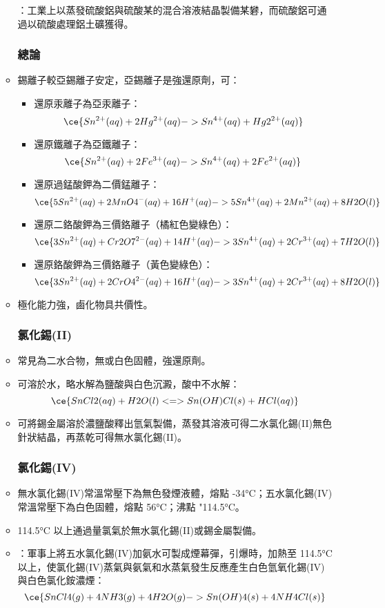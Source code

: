\documentclass[a4paper,12pt]{report}
\begin{document}
\begin{itemize}
\begin{itemize}
：工業上以蒸發硫酸鋁與硫酸某的混合溶液結晶製備某礬，而硫酸鋁可通過以硫酸處理鋁土礦獲得。
\subsubsection{總論}
\bit
\item 錫離子較亞錫離子安定，亞錫離子是強還原劑，可：
\begin{itemize}
\item 還原汞離子為亞汞離子：
\[\ce{Sn^{2+}(aq) + 2Hg^{2+}(aq) -> Sn^{4+}(aq) + Hg2^{2+}(aq)}\]
\item 還原鐵離子為亞鐵離子：
\[\ce{Sn^{2+}(aq) + 2Fe^{3+}(aq) -> Sn^{4+}(aq) + 2Fe^{2+}(aq)}\]
\item 還原過錳酸鉀為二價錳離子：
\[\ce{5Sn^{2+}(aq) + 2MnO4^-(aq) + 16H^+(aq) -> 5Sn^{4+}(aq) + 2Mn^{2+}(aq) + 8H2O(l)}\]
\item 還原二鉻酸鉀為三價鉻離子（橘紅色變綠色）：
\[\ce{3Sn^{2+}(aq) + Cr2O7^{2-}(aq) + 14H^+(aq) -> 3Sn^{4+}(aq) + 2Cr^{3+}(aq) + 7H2O(l)}\]
\item 還原鉻酸鉀為三價鉻離子（黃色變綠色）：
\[\ce{3Sn^{2+}(aq) + 2CrO4^{2-}(aq) + 16H^+(aq) -> 3Sn^{4+}(aq) + 2Cr^{3+}(aq) + 8H2O(l)}\]
\end{itemize}
\item {}極化能力強，鹵化物具共價性。
\eit
\subsubsection{氯化錫(II)}
\bit
\item 常見為二水合物，無或白色固體，強還原劑。
\item 可溶於水，略水解為鹽酸與白色沉澱，酸中不水解：
\[\ce{SnCl2(aq) + H2O(l) <=> Sn(OH)Cl(s) + HCl(aq)}\]
\item 可將錫金屬溶於濃鹽酸釋出氫氣製備，蒸發其溶液可得二水氯化錫(II)無色針狀結晶，再蒸乾可得無水氯化錫(II)。
\eit
\subsubsection{氯化錫(IV)}
\bit
\item 無水氯化錫(IV)常溫常壓下為無色發煙液體，熔點 -34°C；五水氯化錫(IV)常溫常壓下為白色固體，熔點 56°C；沸點 "114.5°C。
\item 114.5°C 以上通過量氯氣於無水氯化錫(II)或錫金屬製備。
\item {}：軍事上將五水氯化錫(IV)加氨水可製成煙幕彈，引爆時，加熱至 114.5°C 以上，使氯化錫(IV)蒸氣與氨氣和水蒸氣發生反應產生白色氫氧化錫(IV)與白色氯化銨濃煙：
\[\ce{SnCl4(g) + 4NH3(g) + 4H2O(g) -> Sn(OH)4(s) + 4NH4Cl(s)}\]
\eit
{}

\end{itemize}
\end{itemize}
\end{document}
